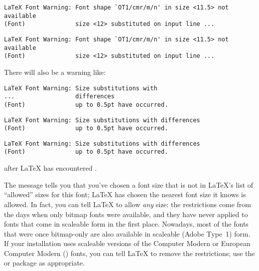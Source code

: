 {\begin{dviversion}
\end{dviversion}
\begin{pdfversion}
\begin{verbatim}
LaTeX Font Warning: Font shape `OT1/cmr/m/n' in size <11.5> not available
(Font)              size <12> substituted on input line ...
\end{verbatim}
\end{pdfversion}
\endhtmlignore
\begin{htmlversion}
\begin{verbatim}
LaTeX Font Warning: Font shape `OT1/cmr/m/n' in size <11.5> not available
(Font)              size <12> substituted on input line ...
\end{verbatim}
\end{htmlversion}
There will also be a warning like:
\htmlignore
\begin{dviversion}
\begin{verbatim}
LaTeX Font Warning: Size substitutions with
...                 differences
(Font)              up to 0.5pt have occurred.
\end{verbatim}
\end{dviversion}
\begin{pdfversion}
\begin{verbatim}
LaTeX Font Warning: Size substitutions with differences
(Font)              up to 0.5pt have occurred.
\end{verbatim}
\end{pdfversion}
\endhtmlignore
\begin{htmlversion}
\begin{verbatim}
LaTeX Font Warning: Size substitutions with differences
(Font)              up to 0.5pt have occurred.
\end{verbatim}
\end{htmlversion}
after \LaTeX{} has encountered .

The message tells you that you've chosen a font size that is not in
\LaTeX{}'s list of ``allowed'' sizes for this font; \LaTeX{} has
chosen the nearest font size it knows is allowed.  In fact, you can
tell \LaTeX{} to allow \emph{any} size: the restrictions come from the
days when only bitmap fonts were available, and they have never
applied to fonts that come in scaleable form in the first place.
Nowadays, most of the fonts that were once bitmap-only are also
available in scaleable (Adobe Type~1) form.  If your installation uses
scaleable versions of the Computer Modern or European Computer Modern
() fonts, you can tell \LaTeX{} to remove the restrictions;
use the  or  package as appropriate.

}
